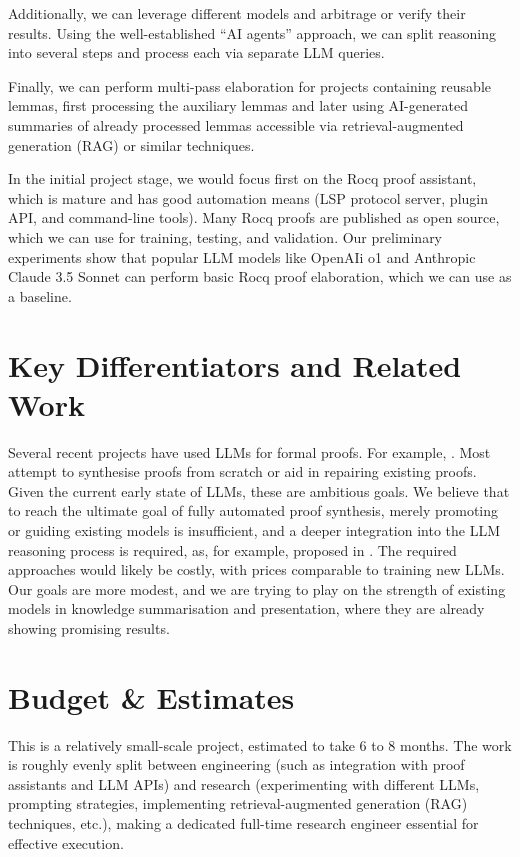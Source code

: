 \documentclass[10pt,nonacm,natbib=false]{acmart}
\begin{document}
Additionally, we can leverage different models and arbitrage or verify
their results. Using the well-established “AI agents” approach, we can
split reasoning into several steps and process each via separate LLM
queries.

Finally, we can perform multi-pass elaboration for projects containing
reusable lemmas, first processing the auxiliary lemmas and later using
AI-generated summaries of already processed lemmas accessible via
retrieval-augmented generation (RAG) or similar techniques.

In the initial project stage, we would focus first on the Rocq proof
assistant, which is mature and has good automation means (LSP protocol
server, plugin API, and command-line tools). Many Rocq proofs are
published as open source, which we can use for training, testing, and
validation. Our preliminary experiments show that popular LLM models
like OpenAIi o1 and Anthropic Claude 3.5 Sonnet can perform basic Rocq
proof elaboration, which we can use as a baseline.

\section*{Key Differentiators and Related Work}

Several recent projects have used LLMs for formal proofs. For example,
\cite{DBLP:journals/corr/abs-2409-14274,
  DBLP:journals/corr/abs-2205-12615,
  DBLP:journals/corr/abs-1905-09381,DBLP:journals/corr/abs-2410-19605,
  DBLP:journals/corr/abs-2306-15626,
  DBLP:journals/corr/abs-2407-03203}.  Most attempt to synthesise
proofs from scratch or aid in repairing existing proofs. Given the
current early state of LLMs, these are ambitious goals. We believe
that to reach the ultimate goal of fully automated proof synthesis,
merely promoting or guiding existing models is insufficient, and a
deeper integration into the LLM reasoning process is required, as, for
example, proposed in \cite{park2024grammaraligneddecoding}. The
required approaches would likely be costly, with prices comparable to
training new LLMs. Our goals are more modest, and we are trying to
play on the strength of existing models in knowledge summarisation and
presentation, where they are already showing promising results.

\section*{Budget \& Estimates}

This is a relatively small-scale project, estimated to take 6 to 8
months. The work is roughly evenly split between engineering (such as
integration with proof assistants and LLM APIs) and research
(experimenting with different LLMs, prompting strategies, implementing
retrieval-augmented generation (RAG) techniques, etc.), making a
dedicated full-time research engineer essential for effective
execution.
\end{document}
